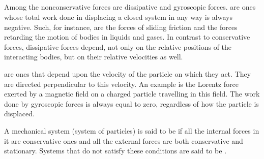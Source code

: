 \subsection{}\label{3.1.7} Among the nonconservative forces are dissipative and gyroscopic forces.  are ones whose total work done in displacing a closed system in any way is always negative. Such, for instance, are the forces of sliding friction and the forces retarding the motion of bodies in liquids and gases. In contrast to conservative forces, dissipative forces depend, not only on the relative positions of the interacting bodies, but on their relative velocities as well.

 are ones that depend upon the velocity of the particle on which they act. They are directed perpendicular to this velocity. An example is the Lorentz force  exerted by a magnetic field on a charged particle travelling in this field. The work done by gyroscopic forces is always equal to zero, regardless of how the particle is displaced.

A mechanical system (system of particles) is said to be  if all the internal forces in it are conservative ones and all the external forces are both conservative and stationary. Systems that do not satisfy these conditions are said to be .

